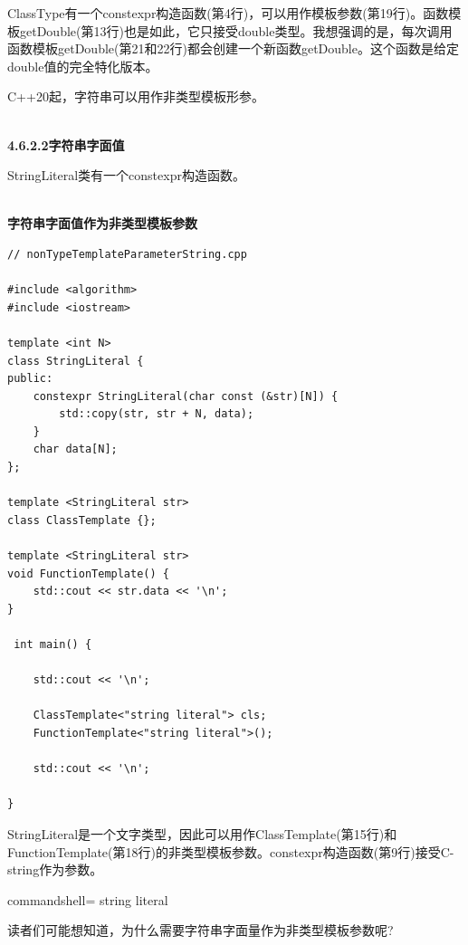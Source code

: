 ClassType有一个constexpr构造函数(第4行)，可以用作模板参数(第19行)。函数模板getDouble(第13行)也是如此，它只接受double类型。我想强调的是，每次调用函数模板getDouble(第21和22行)都会创建一个新函数getDouble。这个函数是给定double值的完全特化版本。

C++20起，字符串可以用作非类型模板形参。

\hspace*{\fill} \\ %
\noindent
\textbf{4.6.2.2\hspace{0.2cm}字符串字面值}

StringLiteral类有一个constexpr构造函数。

\hspace*{\fill} \\ %
\noindent
\textbf{字符串字面值作为非类型模板参数}
\begin{lstlisting}[style=styleCXX]
// nonTypeTemplateParameterString.cpp

#include <algorithm>
#include <iostream>

template <int N>
class StringLiteral {
public:
	constexpr StringLiteral(char const (&str)[N]) {
		std::copy(str, str + N, data);
	}
	char data[N];
};

template <StringLiteral str>
class ClassTemplate {};

template <StringLiteral str>
void FunctionTemplate() {
	std::cout << str.data << '\n';
}

 int main() {
	
	std::cout << '\n';
	
	ClassTemplate<"string literal"> cls;
	FunctionTemplate<"string literal">();
	
	std::cout << '\n';

}
\end{lstlisting}

StringLiteral是一个文字类型，因此可以用作ClassTemplate(第15行)和FunctionTemplate(第18行)的非类型模板参数。constexpr构造函数(第9行)接受C-string作为参数。

\begin{tcblisting}{commandshell={}}
string literal
\end{tcblisting}

读者们可能想知道，为什么需要字符串字面量作为非类型模板参数呢?

